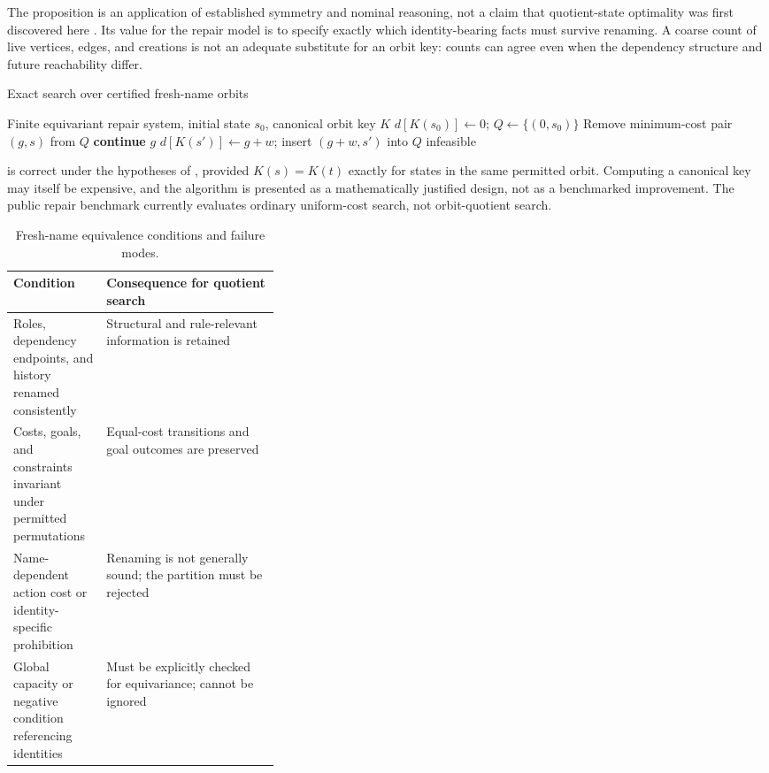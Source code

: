 \documentclass[11pt,a4paper]{article}
\newcommand{\Goal}{\operatorname{Goal}}
\begin{document}
The proposition is an application of established symmetry and nominal reasoning, not a claim that quotient-state optimality was first discovered here \cite{Fernandez2005,Burch1992,Emerson2005,Konig2025}. Its value for the repair model is to specify exactly which identity-bearing facts must survive renaming. A coarse count of live vertices, edges, and creations is not an adequate substitute for an orbit key: counts can agree even when the dependency structure and future reachability differ.

\begin{algorithm}[H]\caption{Exact search over certified fresh-name orbits}\label{alg:orbit}
\begin{algorithmic}[1]
\Require Finite equivariant repair system, initial state $s_0$, canonical orbit key $K$
\State $d[K(s_0)]\gets0$; $Q\gets\{(0,s_0)\}$
  \State Remove minimum-cost pair $(g,s)$ from $Q$
   \State \textbf{continue} \EndIf
  \If{$\Goal(s)$} \State \Return $g$ \EndIf
      \State $d[K(s')]\gets g+w$; insert $(g+w,s')$ into $Q$
    \EndIf
  \EndFor
\EndWhile
\State \Return infeasible
\end{algorithmic}
\end{algorithm}

 is correct under the hypotheses of , provided $K(s)=K(t)$ exactly for states in the same permitted orbit. Computing a canonical key may itself be expensive, and the algorithm is presented as a mathematically justified design, not as a benchmarked improvement. The public repair benchmark currently evaluates ordinary uniform-cost search, not orbit-quotient search.

\begin{table}[H]\centering\caption{Fresh-name equivalence conditions and failure modes.}\label{tab:symmetry}\small
\begin{tabularx}{\linewidth}{@{}p{0.35\linewidth}X@{}}\toprule
Condition & Consequence for quotient search\\\midrule
Roles, dependency endpoints, and history renamed consistently & Structural and rule-relevant information is retained\\
Costs, goals, and constraints invariant under permitted permutations & Equal-cost transitions and goal outcomes are preserved\\
Name-dependent action cost or identity-specific prohibition & Renaming is not generally sound; the partition must be rejected\\
Global capacity or negative condition referencing identities & Must be explicitly checked for equivariance; cannot be ignored\\\bottomrule
\end{tabularx}\end{table}
\end{document}
